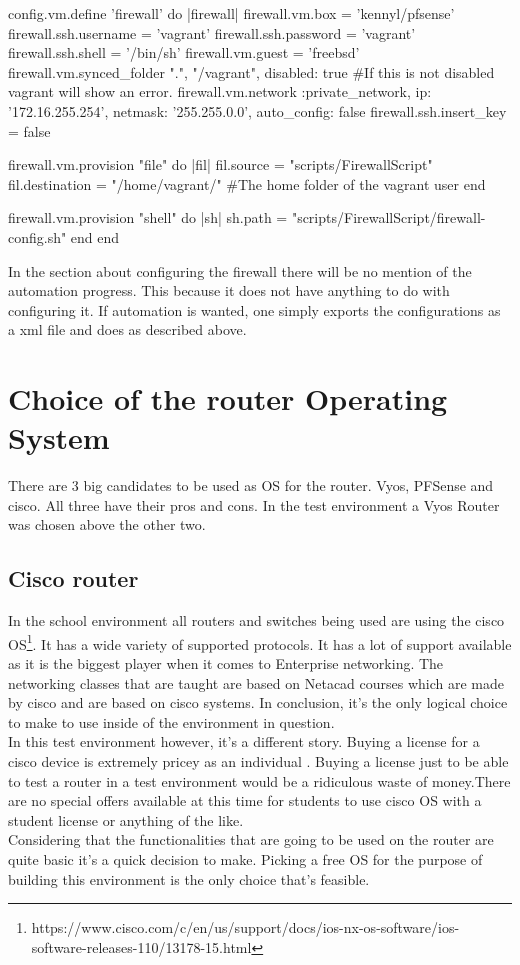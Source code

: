 \begin{cisco}[title=PFSense automation in the vagrantfile]
  config.vm.define 'firewall' do |firewall|
    firewall.vm.box = 'kennyl/pfsense'
    firewall.ssh.username = 'vagrant'
    firewall.ssh.password = 'vagrant'
    firewall.ssh.shell = '/bin/sh'
    firewall.vm.guest = 'freebsd'
    firewall.vm.synced_folder ".", "/vagrant", disabled: true #If this is not disabled vagrant will show an error.
    firewall.vm.network :private_network,
      ip: '172.16.255.254',
      netmask: '255.255.0.0',
      auto_config: false
    firewall.ssh.insert_key = false

    firewall.vm.provision "file" do |fil|
      fil.source = "scripts/FirewallScript"
      fil.destination = "/home/vagrant/" #The home folder of the vagrant user
    end

    firewall.vm.provision "shell" do |sh|
      sh.path = "scripts/FirewallScript/firewall-config.sh"
    end
  end
\end{cisco}
In the section about configuring the firewall there will be no mention of the automation progress. This because it does not have anything to do with configuring it. If automation is wanted, one simply exports the configurations as a xml file and does as described above.
\section{ Choice of the router Operating System }
There are 3 big candidates to be used as OS for the router. Vyos, PFSense and cisco. All three have their pros and cons. In the test environment a Vyos Router was chosen above the other two.
\subsection{ Cisco router}
In the school environment all routers and switches being used are using the cisco OS\footnote{
https://www.cisco.com/c/en/us/support/docs/ios-nx-os-software/ios-software-releases-110/13178-15.html}. It has a wide variety of supported protocols. It has a lot of support available as it is the biggest player when it comes to Enterprise networking\textcite{ciscoRich}. The networking classes that are taught are based on Netacad courses which are made by cisco and are based on cisco systems. In conclusion, it's the only logical choice to make to use inside of the environment in question. \\
In this test environment however, it's a different story. Buying a license for a cisco device is extremely pricey as an individual . Buying a license just to be able to test a router in a test environment would be a ridiculous waste of money.There are no special offers available at this time for students to use cisco OS with a student license or anything of the like. \\
Considering that the functionalities that are going to be used on the router are quite basic it's a quick decision to make. Picking a free OS for the purpose of building this environment is the only choice that's feasible.
